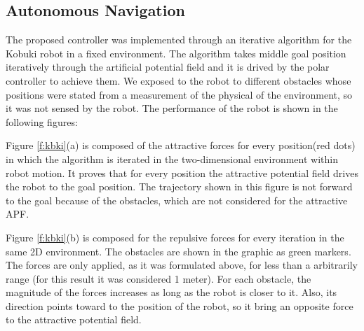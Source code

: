 \documentclass[conference]{IEEEtran}
\begin{document}
\subsection{Autonomous Navigation}
The proposed controller was implemented through an iterative algorithm for the Kobuki robot in a fixed environment. The algorithm takes middle goal position iteratively through the artificial potential field and it is drived by the polar controller to achieve them. We exposed to the robot to different obstacles whose positions were stated from a measurement of the physical of the environment, so it was not sensed by the robot. The performance of the robot is  shown in the following figures:

Figure \ref{f:kbki}(a) is composed of the attractive forces for every position(red dots) in which the algorithm is iterated in the two-dimensional environment within robot motion. It proves that for every position the attractive potential field drives the robot to the goal position. The trajectory shown in this figure is not forward to the goal because of the obstacles, which are not considered for the attractive APF. 

Figure \ref{f:kbki}(b) is composed for the repulsive forces for every iteration in the same 2D environment. The obstacles are shown in the graphic as green markers. The forces are only applied, as it was formulated above, for less than a arbitrarily range (for this result it was considered 1 meter). For each obstacle, the magnitude of the forces  increases as long as the robot is closer to it. Also, its direction points toward to the position of the robot, so it bring an opposite force to the attractive potential field.
\end{document}
